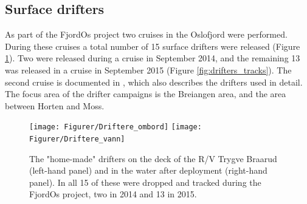 \subsection{Surface drifters}
\label{subsec:drifto}
As part of the FjordOs project two cruises in the Oslofjord were performed. During these cruises a total number of 15 surface drifters were released (Figure \ref{fig:drifters_design}). Two were released during a cruise in September 2014, and the remaining 13 was released in a cruise in September 2015 (Figure \ref{fig:drifters_tracks}). The second cruise is documented in \cite{hjelm:etal:2016}, which also describes the drifters used in detail. The focus area of the drifter campaigns is the Breiangen area, and the area between Horten and Moss.

\begin{figure}[htb]
	\centerline{
		\texttt{[image: Figurer/Driftere\_ombord]}\hspace{2cm}
		\texttt{[image: Figurer/Driftere\_vann]}
		}
	\caption{\small The "home-made" drifters on the deck of the R/V Trygve Braarud (left-hand panel) and in the water after deployment (right-hand panel). In all 15 of these were dropped and tracked during the FjordOs project, two in 2014 and 13 in 2015.}
	\label{fig:drifters_design}
\end{figure}

